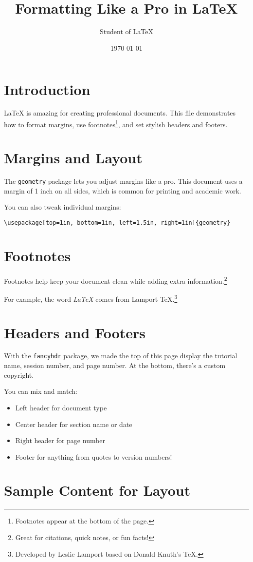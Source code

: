 \documentclass[12pt]{article}
\title{Formatting Like a Pro in \LaTeX}
\author{Student of LaTeX}
\date{\today}
\begin{document}
\maketitle

\section{Introduction}
LaTeX is amazing for creating professional documents. This file demonstrates how to format margins, use footnotes\footnote{Footnotes appear at the bottom of the page.}, and set stylish headers and footers.

\section{Margins and Layout}
The \texttt{geometry} package lets you adjust margins like a pro. This document uses a margin of 1 inch on all sides, which is common for printing and academic work.

You can also tweak individual margins:
\begin{verbatim}
\usepackage[top=1in, bottom=1in, left=1.5in, right=1in]{geometry}
\end{verbatim}

\section{Footnotes}
Footnotes help keep your document clean while adding extra information.\footnote{Great for citations, quick notes, or fun facts!}

For example, the word \textit{LaTeX} comes from Lamport TeX.\footnote{Developed by Leslie Lamport based on Donald Knuth's TeX.}

\section{Headers and Footers}
With the \texttt{fancyhdr} package, we made the top of this page display the tutorial name, session number, and page number. At the bottom, there’s a custom copyright.

You can mix and match:
\begin{itemize}
  \item Left header for document type
  \item Center header for section name or date
  \item Right header for page number
  \item Footer for anything from quotes to version numbers!
\end{itemize}

\section{Sample Content for Layout}
\lipsum[1-2]  %
\end{document}
